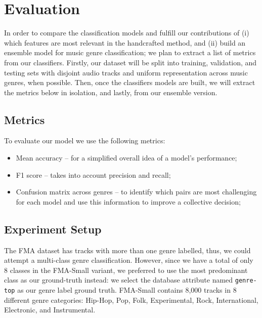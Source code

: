 \section{Evaluation}

In order to compare the classification models and fulfill our contributions of (i) which features are most relevant in the handcrafted method, and (ii) build an ensemble model for music genre classification; we plan to extract a list of metrics from our classifiers. Firstly, our dataset will be split into training, validation, and testing sets with disjoint audio tracks and uniform representation across music genres, when possible. Then, once the classifiers models are built, we will extract the metrics below in isolation, and lastly, from our ensemble version.

\subsection{Metrics}

To evaluate our model we use the following metrics:

\begin{itemize}
    \item Mean accuracy -- for a simplified overall idea of a model's performance;
    \item F1 score -- takes into account precision and recall;
    \item Confusion matrix across genres -- to identify which pairs are most challenging for each model and use this information to improve a collective decision;
\end{itemize}


\subsection{Experiment Setup}

The FMA dataset has tracks with more than one genre labelled, thus, we could attempt a multi-class genre classification. However, since we have a total of only 8 classes in the FMA-Small variant, we preferred to use the most predominant class as our ground-truth instead: we select the database attribute named \texttt{genre-top} as our genre label ground truth. FMA-Small contains 8,000 tracks in 8 different genre categories: Hip-Hop, Pop, Folk, Experimental, Rock, International, Electronic, and Instrumental.

